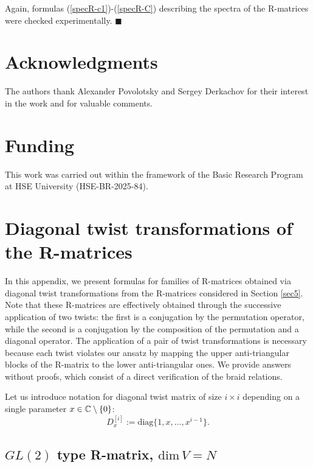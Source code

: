 \documentclass[11pt]{article}
\def\theequation{\thesection.\arabic{equation}}
\begin{document}
Again, formulas (\ref{specR-c1})-(\ref{specR-C}) describing the spectra of the R-matrices were checked experimentally.  
\phantom{a}\hfill$\blacksquare$





\section*{Acknowledgments}
The authors thank Alexander Povolotsky and Sergey Derkachov for their interest in the work and for valuable comments.

\section*{Funding}
This work was carried out within the framework of the Basic Research
Program at HSE University (HSE-BR-2025-84).
\bigskip

\appendix
\section{Diagonal twist transformations of the R-matrices}

\def\theequation{\thesection.\arabic{equation}}
\makeatletter{}\makeatother

In this appendix, we present formulas for families of R-matrices obtained via diagonal twist transformations \cite{Resh} from the R-matrices considered in Section \ref{sec5}. Note that these R-matrices are effectively obtained through the successive application of two twists: the first is a conjugation by the permutation operator, while the second is a conjugation by the composition of the permutation and a diagonal operator. The application of a pair of twist transformations is necessary because each twist violates our ansatz by mapping the upper anti-triangular blocks of the R-matrix to the lower anti-triangular ones.
We provide answers without proofs, which consist of a direct verification of the braid relations.\smallskip


Let us introduce notation for diagonal twist matrix of size $i\times i$ depending on a single parameter $x\in {\Bbb C}\setminus \{0\}$:
$$
D_x^{[i]} := \mbox{diag}\{1,x,\dots , x^{i-1}\}.
$$
\subsection{$GL(2)$ type R-matrix, $\mbox{dim}\, V=N$}
\end{document}
